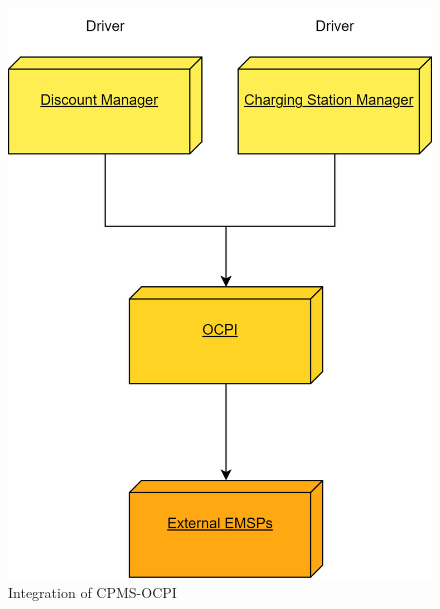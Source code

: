 \documentclass[table, 12pt]{article}
\begin{document}
\begin{figure}[H]
    \centering
    \includegraphics[scale=0.6]{assets/Integration Diagrams/CPMS-OCPI.png} 
    \caption{Integration of CPMS-OCPI}%
    \label{fig: CPMS-OCPI}%
\end{figure}
\end{document}

